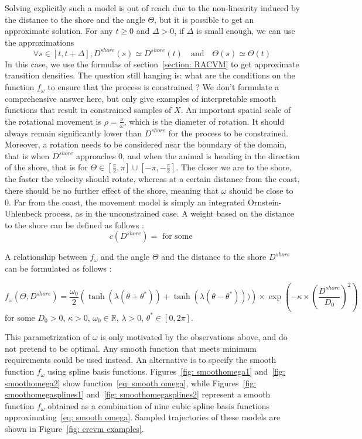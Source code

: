 \documentclass[11pt]{article}
\newcommand {\R}{\mathbb{R}}
\newcommand {\1}{\mathbb{1}}
\theoremstyle{definition}
\theoremstyle{remark}
\theoremstyle{remark}
\begin{document}
Solving explicitly such a model is out of reach due to the non-linearity induced by the distance to the shore and the angle $\Theta$, but it is possible to get an approximate solution.
For any $t \geq 0$ and $\Delta>0$, if $\Delta$ is small enough, we can use the approximations
\[\forall s \in [t,t+\Delta], D^{shore}(s) \simeq D^{shore}(t) \quad \mbox{and} \quad  \Theta(s)\simeq \Theta(t)\]
In this case, we use the formulas of section~\ref{section: RACVM} to get approximate transition densities.
The question still hanging is: what are the conditions on the function $f_{\omega}$ to ensure that the process is constrained ?
We don't formulate a comprehensive answer here, but only give examples of interpretable smooth functions that result in constrained samples of $X$.
An important spatial scale of the rotational movement is $\rho=\frac{\nu}{\omega}$, which is the diameter of rotation. It should always remain significantly lower than $D^{shore}$ for the process to be constrained. Moreover, a rotation needs to be considered near the boundary of the domain, that is when $D^{shore}$ approaches $0$, and when the animal is heading in the direction of the shore, that is for $\Theta \in \left[\frac{\pi}{2},\pi\right] \cup \left[-\pi,-\frac{\pi}{2}\right]$.
The closer we are to the shore, the faster the velocity should rotate,
whereas at a certain distance from the coast, there should be no further effect of the shore, meaning that $\omega$ should be close to $0$. Far from the coast, the movement model is simply an integrated Ornstein-Uhlenbeck process, as in the unconstrained case.
A weight based on the distance to the shore can be defined as follows :
\[c(D^{shore})=\mbox{ for some } \]

A relationship between $f_{\omega}$ and the angle $\Theta$ and the distance to the shore $D^{shore}$ can be formulated as follows :

\begin{equation}
f_{\omega}(\Theta,D^{shore})=\frac{\omega_0}{2}\left(\tanh(\lambda(\theta+\theta^{*}))+\tanh(\lambda(\theta-\theta^{*})))\right)\times \exp\left(-\kappa \times \left(\frac{D^{shore}}{D_0}\right)^2\right)
\label{eq: smooth omega}
\end{equation}
for some $D_0>0$, $\kappa>0$, $\omega_0 \in \R$, $\lambda>0$, $\theta^* \in [0,2\pi]$.

This parametrization of $\omega$ is only motivated by the observations above, and do not pretend to be optimal. Any smooth function that meets minimum requirements could be used instead. An alternative is to specify the smooth function $f_{\omega}$ using spline basis functions. Figures~\ref{fig: smoothomega1} and~\ref{fig: smoothomega2} show function~\eqref{eq: smooth omega}, while Figures~\ref{fig: smoothomegasplines1} and~\ref{fig: smoothomegasplines2}  represent a smooth function $f_{\omega}$ obtained as a combination of nine cubic spline basis functions approximating~\eqref{eq: smooth omega}. Sampled trajectories of these models are shown in Figure~\ref{fig: crcvm examples}.
\end{document}
